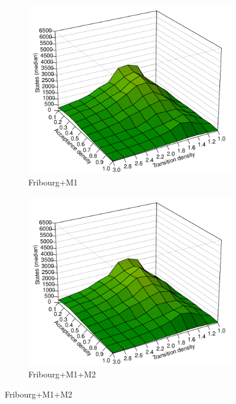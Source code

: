 \begin{figure}[ht]
\centering
  \hfill
  \begin{subfigure}[t]{\perspwidth\textwidth}
  \centering
  \includegraphics[width=\textwidth]{figures/r/internal/goal/s.median.Fribourg+M1.pdf}
  \caption{Fribourg+M1}
  \end{subfigure}
  \hfill
  \hfill
  \begin{subfigure}[t]{\perspwidth\textwidth}
  \centering
  \includegraphics[width=\textwidth]{figures/r/internal/goal/s.median.Fribourg+M1+M2.pdf}
  \caption{Fribourg+M1+M2}
  \end{subfigure}
  \hfill


\end{figure}
